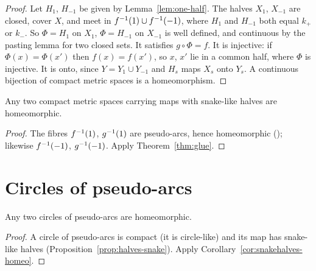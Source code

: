 \begin{proof}
Let $H_1$, $H_{-1}$ be given by Lemma~\ref{lem:one-half}. The halves $X_1$, $X_{-1}$ are closed, cover $X$, and meet in $f^{-1}(1)\cup f^{-1}(-1)$, where $H_1$ and $H_{-1}$
both equal $k_+$ or $k_-$. So $\Phi=H_1$ on $X_1$, $\Phi=H_{-1}$ on $X_{-1}$ is well defined, and continuous by the pasting lemma for two closed sets. It satisfies $g\circ\Phi=f$.
It is injective: if $\Phi(x)=\Phi(x')$ then $f(x)=f(x')$, so $x$, $x'$ lie in a common half, where $\Phi$ is injective. It is onto, since $Y=Y_1\cup Y_{-1}$ and $H_s$ maps
$X_s$ onto $Y_s$. A continuous bijection of compact metric spaces is a homeomorphism.
\end{proof}


\begin{corollary}\label{cor:snakehalves-homeo}
Any two compact metric spaces carrying maps with snake-like halves are homeomorphic.
\end{corollary}

\begin{proof}
The fibres $f^{-1}(1)$, $g^{-1}(1)$ are pseudo-arcs, hence homeomorphic (); likewise $f^{-1}(-1)$, $g^{-1}(-1)$. Apply Theorem~\ref{thm:glue}.
\end{proof}


\section{Circles of pseudo-arcs}

\begin{theorem}\label{thm:unique}
Any two circles of pseudo-arcs are homeomorphic.
\end{theorem}

\begin{proof}
A circle of pseudo-arcs is compact (it is circle-like) and its map has snake-like halves (Proposition~\ref{prop:halves-snake}). Apply Corollary~\ref{cor:snakehalves-homeo}.
\end{proof}


